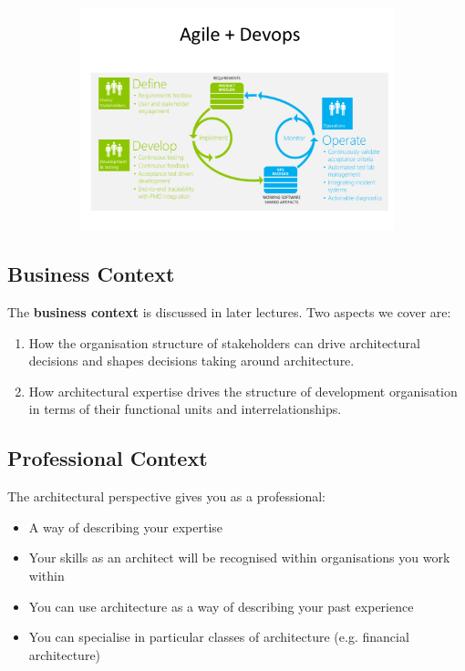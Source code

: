 \documentclass[a4paper]{article}
\begin{document}
\begin{figure}[H]
\hskip-2.5cm\begin{subfigure}{1.2\textwidth}
  \includegraphics[width=1.2\linewidth]
  {images/3-ADevops.png}
\end{subfigure}
\end{figure}

\subsection{Business Context}
The \textbf{business context} is discussed in later lectures. Two aspects we cover are:
\begin{enumerate}
\item How the organisation structure of stakeholders can drive architectural decisions and shapes decisions taking around architecture.
\item How architectural expertise drives the structure of development organisation in terms of their functional units and interrelationships.
\end{enumerate}
\subsection{Professional Context}
The architectural perspective gives you as a professional:
\begin{itemize}
\item A way of describing your expertise
\item Your skills as an architect will be recognised within organisations you work within
\item You can use architecture as a way of describing your past experience
\item You can specialise in particular classes of architecture (e.g. financial architecture)
\end{itemize}
\end{document}
